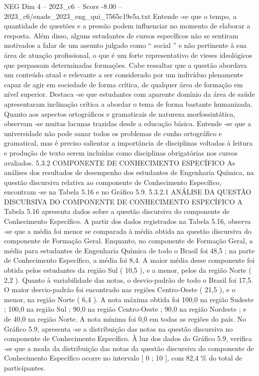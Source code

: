 \begin{textsample}{NEG Dim 4 – 2023\_c6 – Score -8.00 – 2023\_c6/enade\_2023\_eng\_qui\_7565c19e5a.txt}
Entende -se que o tempo, a quantidade de questões e a pressão podem influenciar no momento de elaborar a resposta.
Além disso, alguns estudantes de cursos específicos não se sentiram motivados a falar de um assunto julgado como “ social ” e não pertinente à sua área de atuação profissional, o que é um forte representativo de vieses ideológicos que perpassam determinadas formações.
Cabe ressaltar que a questão abordava um conteúdo atual e relevante a ser considerado por um indivíduo plenamente capaz de agir em sociedade de forma crítica, de qualquer área de formação em nível superior.
Destaca -se que estudantes com aparente domínio da área de saúde apresentaram inclinação crítica a abordar o tema de forma bastante humanizada.
Quanto aos aspectos ortográficos e gramaticais de natureza morfossintática, observam -se muitas lacunas trazidas desde a educação básica.
Entende -se que a universidade não pode sanar todos os problemas de cunho ortográfico e gramatical, mas é preciso salientar a importância de disciplinas voltadas à leitura e produção de texto serem incluídas como disciplinas obrigatórias nos cursos avaliados. 5.3.2 COMPONENTE DE CONHECIMENTO ESPECÍFICO As análises dos resultados de desempenho dos estudantes de Engenharia Química, na questão discursiva relativa ao componente de Conhecimento Específico, encontram -se na Tabela 5.16 e no Gráfico 5.9. 5.3.2.1 ANÁLISE DA QUESTÃO DISCURSIVA DO COMPONENTE DE CONHECIMENTO ESPECÍFICO A Tabela 5.16 apresenta dados sobre a questão discursiva do componente de Conhecimento Específico.
A partir dos dados registrados na Tabela 5.16, observa -se que a média foi menor se comparada à média obtida na questão discursiva do componente de Formação Geral.
Enquanto, no componente de Formação Geral, a média para estudantes de Engenharia Química de todo o Brasil foi 48,5 ; na parte de Conhecimento Específico, a média foi 8,4.
A maior média desse componente foi obtida pelos estudantes da região Sul ( 10,5 ), e a menor, pelos da região Norte ( 2,2 ).
Quanto à variabilidade das notas, o desvio-padrão de todo o Brasil foi 17,5.
O maior desvio-padrão foi encontrado nas regiões Centro-Oeste ( 21,5 ), e o menor, na região Norte ( 6,4 ).
A nota máxima obtida foi 100,0 na região Sudeste ; 100,0 na região Sul ; 90,0 na região Centro-Oeste ; 90,0 na região Nordeste ; e de 40,0 na região Norte.
A nota mínima foi 0,0 em todas as regiões do país.
No Gráfico 5.9, apresenta -se a distribuição das notas na questão discursiva no componente de Conhecimento Específico.
À luz dos dados do Gráfico 5.9, verifica -se que a moda da distribuição das notas da questão discursiva do componente de Conhecimento Específico ocorre no intervalo [ 0 ; 10 ], com 82,4 \% do total de participantes.

\end{textsample}

